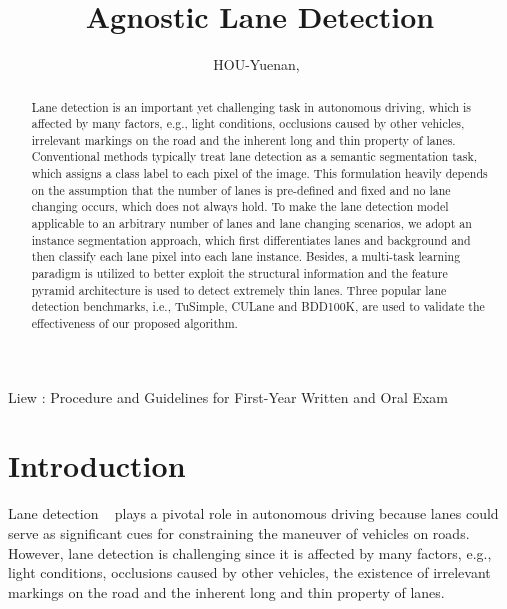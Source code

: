 \documentclass[draftcls]{IEEEtran}
\begin{document}
\title{Agnostic Lane Detection}

\author{HOU-Yuenan,~
}

{Liew : Procedure and Guidelines for First-Year Written and Oral Exam}

\maketitle

\IEEEpeerreviewmaketitle





\begin{abstract}
Lane detection is an important yet challenging task in autonomous driving, which is affected by many factors, e.g., light conditions, occlusions caused by other vehicles, irrelevant markings on the road and the inherent long and thin property of lanes. Conventional methods typically treat lane detection as a semantic segmentation task, which assigns a class label to each pixel of the image. This formulation heavily depends on the assumption that the number of lanes is pre-defined and fixed and no lane changing occurs, which does not always hold. To make the lane detection model applicable to an arbitrary number of lanes and lane changing scenarios, we adopt an instance segmentation approach, which first differentiates lanes and background and then classify each lane pixel into each lane instance. Besides, a multi-task learning paradigm is utilized to better exploit the structural information and the feature pyramid architecture is used to detect extremely thin lanes. Three popular lane detection benchmarks, i.e., TuSimple, CULane and BDD100K, are used to validate the effectiveness of our proposed algorithm.
\end{abstract}

\section{Introduction}

Lane detection ~\cite{bertozzi1998gold} plays a pivotal role in autonomous driving because lanes could serve as significant cues for constraining the maneuver of vehicles on roads. However, lane detection is challenging since it is affected by many factors, e.g., light conditions, occlusions caused by other vehicles, the existence of irrelevant markings on the road and the inherent long and thin property of lanes. 
\end{document}
